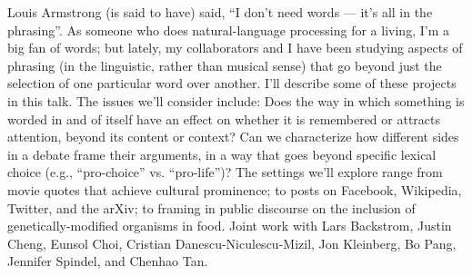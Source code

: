 Louis Armstrong (is said to have) said, ``I don't need words --- it's all in the phrasing''.                    As someone who does natural-language processing for a living, I'm a big fan of words; but lately, my collaborators and I have been studying aspects of phrasing (in the linguistic, rather than musical sense) that go beyond just the selection of one particular word over another.  I'll describe some of these projects in this talk. The issues we'll consider include: Does the way in which something is worded in and of itself have an effect on whether it is remembered or attracts attention, beyond its content or context? Can we characterize how different sides in a debate frame their arguments, in a way that goes beyond specific lexical choice (e.g., ``pro-choice'' vs. ``pro-life'')?  The settings we'll explore range from movie quotes that achieve cultural prominence; to posts on Facebook, Wikipedia, Twitter, and the arXiv; to framing in public discourse on the inclusion of genetically-modified organisms in food. Joint work with Lars Backstrom, Justin Cheng, Eunsol Choi, Cristian Danescu-Niculescu-Mizil, Jon Kleinberg, Bo Pang, Jennifer Spindel, and Chenhao Tan.
